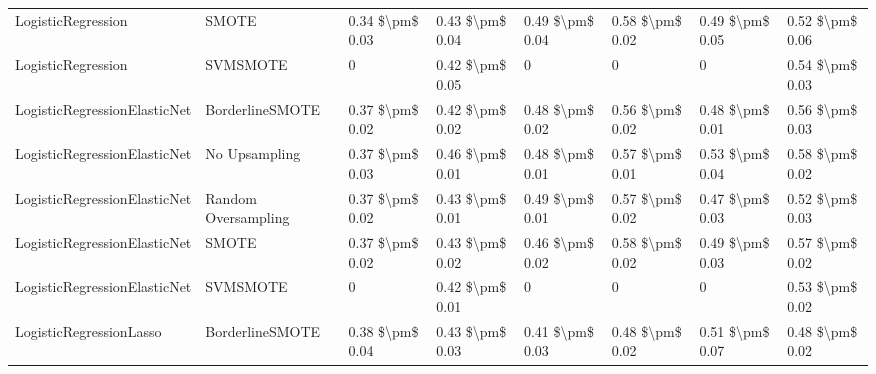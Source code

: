\begin{tabular}{llllllll}
             LogisticRegression &                         SMOTE & 0.34 \$\textbackslash pm\$ 0.03 &           0.43 \$\textbackslash pm\$ 0.04 &       0.49 \$\textbackslash pm\$ 0.04 &        0.58 \$\textbackslash pm\$ 0.02 &                         0.49 \$\textbackslash pm\$ 0.05 &     0.52 \$\textbackslash pm\$ 0.06 \\
             LogisticRegression &                      SVMSMOTE &               0 &           0.42 \$\textbackslash pm\$ 0.05 &                     0 &                      0 &                                       0 &     0.54 \$\textbackslash pm\$ 0.03 \\
   LogisticRegressionElasticNet &               BorderlineSMOTE & 0.37 \$\textbackslash pm\$ 0.02 &           0.42 \$\textbackslash pm\$ 0.02 &       0.48 \$\textbackslash pm\$ 0.02 &        0.56 \$\textbackslash pm\$ 0.02 &                         0.48 \$\textbackslash pm\$ 0.01 &     0.56 \$\textbackslash pm\$ 0.03 \\
   LogisticRegressionElasticNet &                 No Upsampling & 0.37 \$\textbackslash pm\$ 0.03 &           0.46 \$\textbackslash pm\$ 0.01 &       0.48 \$\textbackslash pm\$ 0.01 &        0.57 \$\textbackslash pm\$ 0.01 &                         0.53 \$\textbackslash pm\$ 0.04 &     0.58 \$\textbackslash pm\$ 0.02 \\
   LogisticRegressionElasticNet &           Random Oversampling & 0.37 \$\textbackslash pm\$ 0.02 &           0.43 \$\textbackslash pm\$ 0.01 &       0.49 \$\textbackslash pm\$ 0.01 &        0.57 \$\textbackslash pm\$ 0.02 &                         0.47 \$\textbackslash pm\$ 0.03 &     0.52 \$\textbackslash pm\$ 0.03 \\
   LogisticRegressionElasticNet &                         SMOTE & 0.37 \$\textbackslash pm\$ 0.02 &           0.43 \$\textbackslash pm\$ 0.02 &       0.46 \$\textbackslash pm\$ 0.02 &        0.58 \$\textbackslash pm\$ 0.02 &                         0.49 \$\textbackslash pm\$ 0.03 &     0.57 \$\textbackslash pm\$ 0.02 \\
   LogisticRegressionElasticNet &                      SVMSMOTE &               0 &           0.42 \$\textbackslash pm\$ 0.01 &                     0 &                      0 &                                       0 &     0.53 \$\textbackslash pm\$ 0.02 \\
        LogisticRegressionLasso &               BorderlineSMOTE & 0.38 \$\textbackslash pm\$ 0.04 &           0.43 \$\textbackslash pm\$ 0.03 &       0.41 \$\textbackslash pm\$ 0.03 &        0.48 \$\textbackslash pm\$ 0.02 &                         0.51 \$\textbackslash pm\$ 0.07 &     0.48 \$\textbackslash pm\$ 0.02 \\

\end{tabular}
